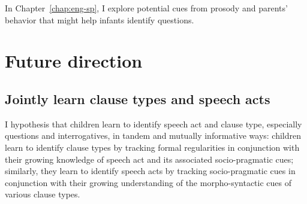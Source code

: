 In Chapter~\ref{chap:eng-sp}, I explore potential cues from prosody and parents' behavior that might help infants identify questions. 


\section{Future direction}
\subsection{Jointly learn clause types and speech acts}
I hypothesis that children learn to identify speech act and clause type,
especially questions and interrogatives, in tandem and mutually informative ways: children
learn to identify clause types by tracking formal regularities in conjunction with their growing
knowledge of speech act and its associated socio-pragmatic cues; similarly, they learn
to identify speech acts by tracking socio-pragmatic cues in conjunction with their growing
understanding of the morpho-syntactic cues of various clause types.
